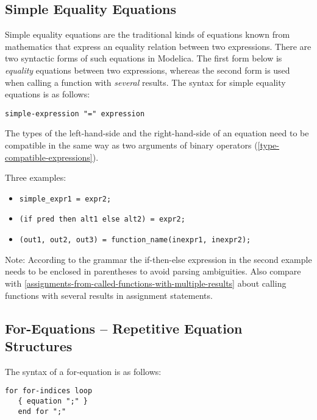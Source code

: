 \subsection{Simple Equality Equations}

Simple equality equations are the traditional kinds of equations known
from mathematics that express an equality relation between two
expressions. There are two syntactic forms of such equations in
Modelica. The first form below is \emph{equality} equations between two
expressions, whereas the second form is used when calling a function
with \emph{several} results. The syntax for simple equality equations is
as follows:
\begin{lstlisting}[language=grammar]
simple-expression "=" expression
\end{lstlisting}
The types of the left-hand-side and the right-hand-side of an equation
need to be compatible in the same way as two arguments of binary
operators (\autoref{type-compatible-expressions}).

Three examples:
\begin{itemize}
\item \lstinline!simple_expr1 = expr2;!
\item \lstinline!(if pred then alt1 else alt2) = expr2;!
\item \lstinline!(out1, out2, out3) = function_name(inexpr1, inexpr2);!
\end{itemize}

\begin{nonnormative}
Note: According to the grammar the if-then-else expression in
the second example needs to be enclosed in parentheses to avoid parsing
ambiguities. Also compare with \autoref{assignments-from-called-functions-with-multiple-results} about calling
functions with several results in assignment statements.
\end{nonnormative}

\subsection{For-Equations -- Repetitive Equation Structures}

The syntax of a for-equation is as follows:
\begin{lstlisting}[language=grammar]
for for-indices loop
   { equation ";" }
   end for ";"
\end{lstlisting}

